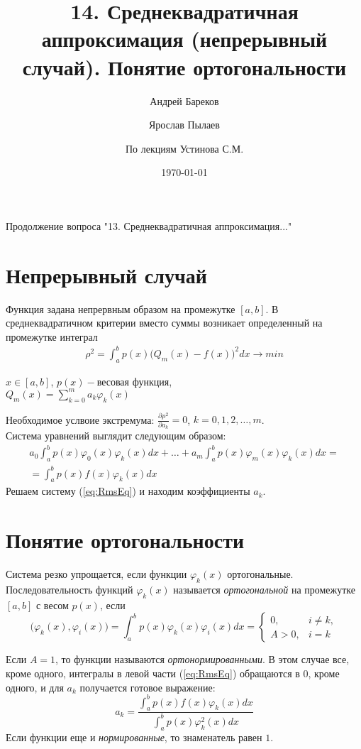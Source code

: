 \documentclass[a4paper,11pt]{article}
\title{14. Среднеквадратичная аппроксимация (непрерывный случай). Понятие ортогональности}
\author{Андрей Бареков \and Ярослав Пылаев \and По лекциям Устинова С.М.}
\date{\today}
\begin{document}
\maketitle
\newpage

Продолжение вопроса "13. Среднеквадратичная аппроксимация..."
\section{Непрерывный случай}
Функция задана непрервным образом на промежутке $[a,b]$.
В среднеквадратичном критерии вместо суммы возникает определенный на промежутке интеграл
\begin{gather*}
  \rho^2 = \int_a^b p(x)\bigg( Q_m(x)-f(x) \bigg)^2 dx \rightarrow min
\end{gather*}
\begin{flushright}
  \small
  $x\in [a,b]$, $p(x) - \text{весовая функция}$, \\
  $Q_m(x) = \sum_{k=0}^m a_k\varphi_k(x)$
\end{flushright}
Необходимое услвоие экстремума: $\frac{\partial \rho^2}{\partial a_k} = 0$, $k=0,1,2,\dots,m$. \\
Система уравнений выглядит следующим образом: \\
\begin{equation}
  \begin{split}
    a_0\int_a^b p(x)\varphi_0(x)\varphi_k(x)dx +\dots+ a_m\int_a^b p(x)\varphi_m(x)\varphi_k(x)dx = \\
    = \int_a^b p(x)f(x)\varphi_k(x)dx
  \end{split}
  \label{eq:RmsEq}
\end{equation}
Решаем систему (\ref{eq:RmsEq}) и находим коэффициенты $a_k$. \\

\section{Понятие ортогональности}
Система резко упрощается, если функции ${\varphi_k(x)}$ ортогональные.
Последовательность функций ${\varphi_k(x)}$ называется \textit{ортогональной} на промежутке $[a,b]$ с весом $p(x)$, если
\begin{equation}
 \bigg(\varphi_k(x), \varphi_i(x)\bigg) = \int_a^b p(x)\varphi_k(x)\varphi_i(x)dx =
 \begin{cases}
   0, & i \ne k, \\
   A>0, & i=k
 \end{cases}
\end{equation}

Если $A=1$, то функции называются \textit{ортонормированными}. В этом случае все, кроме одного, интегралы в левой части
(\ref{eq:RmsEq}) обращаются в $0$, кроме одного, и для $a_k$ получается готовое выражение:
\begin{equation*}
  a_k = \frac{\int_a^b p(x)f(x)\varphi_k(x)dx}{\int_a^b p(x)\varphi_k^2(x)dx}
\end{equation*}
Если функции еще и \textit{нормированные}, то знаменатель равен $1$.
\end{document}
